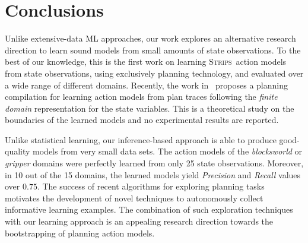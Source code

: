 \documentclass{article}
\newcommand{\strips}{\textsc{Strips}}     %
\begin{document}
\section{Conclusions}
\label{conclusions}

Unlike extensive-data ML approaches, our work explores an alternative research direction to learn sound models from small amounts of state observations. To the best of our knowledge, this is the first work on learning \strips\ action models from state observations, using exclusively planning technology, and evaluated over a wide range of different domains. Recently, the work in~\cite{SternJ17} proposes a planning compilation for learning action models from plan traces following the {\em finite domain} representation for the state variables. This is a theoretical study on the boundaries of the learned models and no experimental results are reported.

Unlike statistical learning, our inference-based approach is able to produce good-quality models from very small data sets. The action models of the {\em blocksworld} or {\em gripper} domains were perfectly learned from only 25 state observations. Moreover, in 10 out of the 15 domains, the learned models yield {\em Precision} and {\em Recall} values over $0.75$. The success of recent algorithms for exploring planning tasks~\cite{FrancesRLG17} motivates the development of novel techniques to autonomously collect informative learning examples. The combination of such exploration techniques with our learning approach is an appealing research direction towards the bootstrapping of planning action models.




\end{document}
